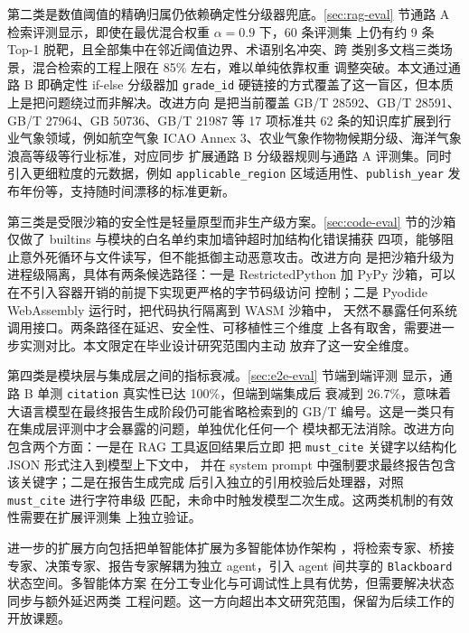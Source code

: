 第二类是数值阈值的精确归属仍依赖确定性分级器兜底。\ref{sec:rag-eval}
节通路 A 检索评测显示，即使在最优混合权重 $\alpha=0.9$ 下，60 条评测集
上仍有约 9 条 Top-1 脱靶，且全部集中在邻近阈值边界、术语别名冲突、跨
类别多文档三类场景，混合检索的工程上限在 85\% 左右，难以单纯依靠权重
调整突破。本文通过通路 B 即确定性 if-else 分级器加 \texttt{grade\_\bk{}id}
硬链接的方式覆盖了这一盲区，但本质上是把问题绕过而非解决。改进方向
是把当前覆盖 GB/T 28592、GB/T 28591、GB/T 27964、GB 50736、GB/T 21987
等 17 项标准共 62 条的知识库扩展到行业气象领域，例如航空气象 ICAO
Annex 3、农业气象作物物候期分级、海洋气象浪高等级等行业标准，对应同步
扩展通路 B 分级器规则与通路 A 评测集。同时引入更细粒度的元数据，例如
\texttt{applicable\_\bk{}region} 区域适用性、\texttt{publish\_\bk{}year}
发布年份等，支持随时间漂移的标准更新。

第三类是受限沙箱的安全性是轻量原型而非生产级方案。\ref{sec:code-eval}
节的沙箱仅做了 builtins 与模块的白名单约束加墙钟超时加结构化错误捕获
四项，能够阻止意外死循环与文件读写，但不能抵御主动恶意攻击。改进方向
是把沙箱升级为进程级隔离，具体有两条候选路径：一是 RestrictedPython
加 PyPy 沙箱，可以在不引入容器开销的前提下实现更严格的字节码级访问
控制；二是 Pyodide WebAssembly 运行时，把代码执行隔离到 WASM 沙箱中，
天然不暴露任何系统调用接口。两条路径在延迟、安全性、可移植性三个维度
上各有取舍，需要进一步实测对比。本文限定在毕业设计研究范围内主动
放弃了这一安全维度。

第四类是模块层与集成层之间的指标衰减。\ref{sec:e2e-eval} 节端到端评测
显示，通路 B 单测 \texttt{citation} 真实性已达 100\%，但端到端集成后
衰减到 26.7\%，意味着大语言模型在最终报告生成阶段仍可能省略检索到的
GB/T 编号。这是一类只有在集成层评测中才会暴露的问题，单独优化任何一个
模块都无法消除。改进方向包含两个方面：一是在 RAG 工具返回结果后立即
把 \texttt{must\_\bk{}cite} 关键字以结构化 JSON 形式注入到模型上下文中，
并在 system prompt 中强制要求最终报告包含该关键字；二是在报告生成完成
后引入独立的引用校验后处理器，对照 \texttt{must\_\bk{}cite} 进行字符串级
匹配，未命中时触发模型二次生成。这两类机制的有效性需要在扩展评测集
上独立验证。

进一步的扩展方向包括把单智能体扩展为多智能体协作架构
\cite{ref1, ref19}，将检索专家、桥接专家、决策专家、报告专家解耦为独立
agent，引入 agent 间共享的 \texttt{Blackboard} 状态空间。多智能体方案
在分工专业化与可调试性上具有优势，但需要解决状态同步与额外延迟两类
工程问题。这一方向超出本文研究范围，保留为后续工作的开放课题。
